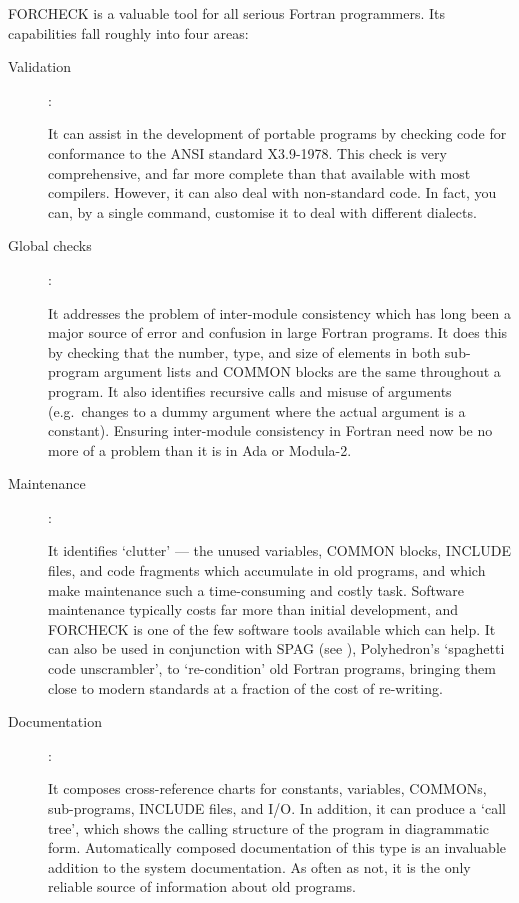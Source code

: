 FORCHECK is a valuable tool for all serious Fortran programmers.
Its capabilities fall roughly into four areas:
\begin{description}
\item [Validation]:

It can assist in the development of portable programs by checking code for
conformance to the ANSI standard X3.9-1978.
This check is very comprehensive, and far more complete than that available
with most compilers.
However, it can also deal with non-standard code.
In fact, you can, by a single command, customise it to deal with
different dialects.

\item [Global checks]:

It addresses the problem of inter-module consistency which has long been a
major source of error and confusion in large Fortran programs.
It does this by checking that the number, type, and size of elements in both
sub-program argument lists and COMMON blocks are the same throughout a program.
It also identifies recursive calls and misuse of arguments (e.g.\ changes
to a dummy argument where the actual argument is a constant).
Ensuring inter-module consistency in Fortran need now be no more of a problem
than it is in Ada or Modula-2.

\item [Maintenance]:

It identifies `clutter' --- the unused variables, COMMON blocks, INCLUDE files,
and code fragments which accumulate in old programs, and which make maintenance
such a time-consuming and costly task.
Software maintenance typically costs far more than initial development, and
FORCHECK is one of the few software tools available which can help.
It can also be used in conjunction with SPAG
(see ), Polyhedron's
`spaghetti code unscrambler', to `re-condition' old Fortran programs, bringing
them close to modern standards at a fraction of the cost of re-writing.

\item [Documentation]:

It composes cross-reference charts for constants, variables, COMMONs,
sub-programs, INCLUDE files, and I/O.
In addition, it can produce a `call tree', which shows the calling structure
of the program in diagrammatic form.
Automatically composed documentation of this type is an invaluable addition
to the system documentation.
As often as not, it is the only reliable source of information about old
programs.
\end{description}

